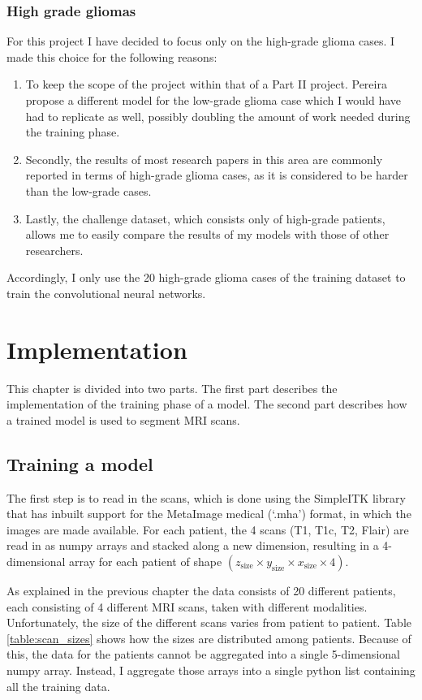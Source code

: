 \documentclass[12pt,a4paper,twoside,openright]{report}
\begin{document}
\subsection{High grade gliomas}
For this project I have decided to focus only on the high-grade glioma cases. I made this choice for the following reasons:
\begin{enumerate}
	\item To keep the scope of the project within that of a Part II project. Pereira propose a different model for the low-grade glioma case which I would have had to replicate as well, possibly doubling the amount of work needed during the training phase.
	\item Secondly, the results of most research papers in this area are commonly reported in terms of high-grade glioma cases, as it is considered to be harder than the low-grade cases. 
	\item Lastly, the challenge dataset, which consists only of high-grade patients, allows me to easily compare the results of my models with those of other researchers. 
\end{enumerate}
Accordingly, I only use the 20 high-grade glioma cases of the training dataset to train the convolutional neural networks.

\chapter{Implementation}
This chapter is divided into two parts. The first part describes the implementation of the training phase of a model. The second part describes how a trained model is used to segment MRI scans.

\section{Training a model}
The first step is to read in the scans, which is done using the SimpleITK library that has inbuilt support for the MetaImage medical (`.mha') format, in which the images are made available. For each patient, the 4 scans (T1, T1c, T2, Flair) are read in as numpy arrays and stacked along a new dimension, resulting in a 4-dimensional array for each patient of shape $(z_{\text{size}} \times y_{\text{size}} \times x_{\text{size}} \times 4)$.
 
As explained in the previous chapter the data consists of 20 different patients, each consisting of 4 different MRI scans, taken with different modalities. Unfortunately, the size of the different scans varies from patient to patient. Table \ref{table:scan_sizes} shows how the sizes are distributed among patients. Because of this, the data for the patients cannot be aggregated into a single 5-dimensional numpy array. Instead, I aggregate those arrays into a single python list containing all the training data.
\end{document}
